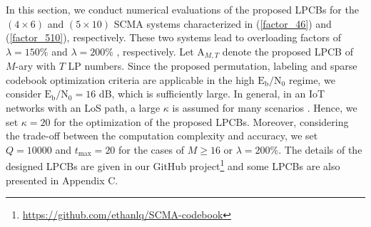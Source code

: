 \documentclass[journal]{IEEEtran}
\begin{document}
In this section,  we conduct numerical evaluations of the proposed LPCBs for the $(4\times 6)$ and $(5\times 10)$ SCMA   systems characterized  in   (\ref{factor_46}) and (\ref{factor_510}), respectively.   These two systems lead to overloading factors of $\lambda =150\%$ and $\lambda = 200\%$ , respectively. 
Let $\text{A}_{M, T}$ denote  the proposed LPCB  of $M$-ary with $T$ LP numbers. Since the proposed permutation, labeling and sparse codebook optimization criteria are applicable in the   high  $\text{E}_\text{b}/\text{N}_0$ regime, we consider  $\text{E}_\text{b}/\text{N}_0 = 16$ dB, which is sufficiently large. In general, in an  IoT networks with an LoS path, a large $\kappa$ is assumed for many  scenarios \cite{5G_NR_s_iot, lutz1991land, vucetic1992channel,ErnestNOMA,WangTrajectory}. Hence, we set $\kappa = 20$ for the optimization of the proposed LPCBs. Moreover,
considering the trade-off between the computation complexity and accuracy, we set $Q=10000$ and $t_{\text{max}}=20$ for the cases of $M \geq 16$ or $\lambda = 200\%$.  The details of the designed LPCBs   are given in  our GitHub project\footnote{\url{https://github.com/ethanlq/SCMA-codebook}} and some LPCBs are also presented in Appendix C.
\end{document}
